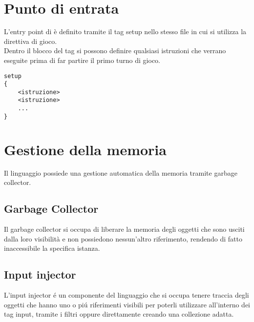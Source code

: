\section{Punto di entrata}
L'entry point di è definito tramite il tag setup nello stesso file in cui 
si utilizza la direttiva di gioco. \\ 
Dentro il blocco del tag si possono definire qualsiasi istruzioni che verrano eseguite
prima di far partire il primo turno di gioco.
\begin{lstlisting}
setup 
{
    <istruzione>
    <istruzione>
    ...
}
\end{lstlisting}

\section{Gestione della memoria}
Il linguaggio possiede una gestione automatica della memoria tramite garbage collector.

\subsection{Garbage Collector}
Il garbage collector si occupa di liberare la memoria degli oggetti che sono usciti 
dalla loro visibilità e non possiedono nessun'altro riferimento, rendendo di fatto 
inaccessibile la specifica istanza. \\

\subsection{Input injector}
L'input injector é un componente del linguaggio che si occupa tenere traccia degli
oggetti che hanno uno o piú riferimenti visibili per poterli utilizzare all'interno 
dei tag input, tramite i filtri oppure direttamente creando una collezione adatta. 